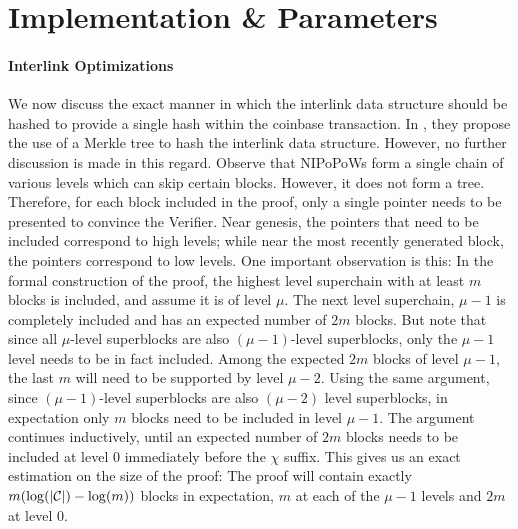 \section{Implementation \& Parameters}

\paragraph{Interlink Optimizations}
We now discuss the exact manner in which the interlink data structure should be
hashed to provide a single hash within the coinbase transaction. In \cite{KLS},
they propose the use of a Merkle tree to hash the interlink data structure.
However, no further discussion is made in this regard. Observe that NIPoPoWs
form a single chain of various levels which can skip certain blocks. However,
it does not form a tree. Therefore, for each block included in the proof, only
a single pointer needs to be presented to convince the Verifier. Near genesis,
the pointers that need to be included correspond to high levels; while near the
most recently generated block, the pointers correspond to low levels. One
important observation is this: In the formal construction of the proof, the
highest level superchain with at least $m$ blocks is included, and assume it is
of level $\mu$. The next level superchain, $\mu - 1$ is completely included and
has an expected number of $2m$ blocks. But note that since all $\mu$-level
superblocks are also $(\mu - 1)$-level superblocks, only the $\mu - 1$ level
needs to be in fact included. Among the expected $2m$ blocks of level $\mu -
1$, the last $m$ will need to be supported by level $\mu - 2$. Using the same
argument, since $(\mu - 1)$-level superblocks are also $(\mu - 2)$ level
superblocks, in expectation only $m$ blocks need to be included in level $\mu
- 1$. The argument continues inductively, until an expected number of $2m$
blocks needs to be included at level $0$ immediately before the $\chi$ suffix.
This gives us an exact estimation on the size of the proof: The proof will
contain exactly $m (\log(|\mathcal{C}|) - \log(m))$ blocks in expectation, $m$ at each of
the $\mu - 1$ levels and $2m$ at level $0$.

